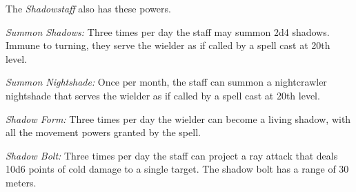 The \emph{Shadowstaff} also has these powers.
\begin{itemize*}
\item \textit{Summon Shadows:} Three times per day the staff may summon 2d4 shadows. Immune to turning, they serve the wielder as if called by a  spell cast at 20th level.
\item \textit{Summon Nightshade:} Once per month, the staff can summon a nightcrawler nightshade that serves the wielder as if called by a  spell cast at 20th level.
\item \textit{Shadow Form:} Three times per day the wielder can become a living shadow, with all the movement powers granted by the  spell.
\item \textit{Shadow Bolt:} Three times per day the staff can project a ray attack that deals 10d6 points of cold damage to a single target. The shadow bolt has a range of 30 meters.
\end{itemize*}
